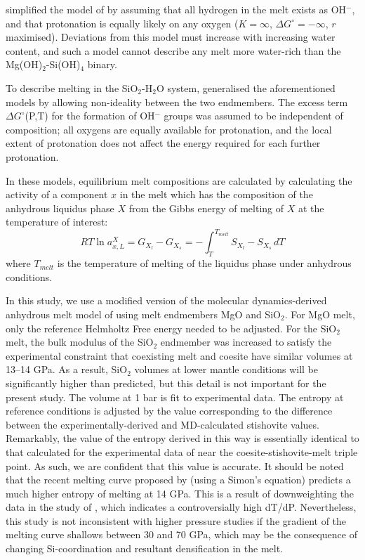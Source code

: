 \documentclass[review]{elsarticle}
\begin{document}
\cite{THH2012} simplified the model of \cite{SS1985} by assuming that all hydrogen in the melt exists as OH$^-$, and that protonation is equally likely on any oxygen ($K=\infty$, $\Delta G^{\circ}=-\infty$, $r$ maximised). Deviations from this model must increase with increasing water content, and such a model cannot describe any melt more water-rich than the Mg(OH)$_2$-Si(OH)$_4$ binary. 

To describe melting in the SiO$_2$-H$_2$O system, \cite{HM2012} generalised the aforementioned models by allowing non-ideality between the two endmembers. The excess term $\Delta G^{\circ}$(P,T) for the formation of OH$^-$ groups was assumed to be independent of composition; all oxygens are equally available for protonation, and the local extent of protonation does not affect the energy required for each further protonation.

In these models, equilibrium melt compositions are calculated by calculating the activity of a component $x$ in the melt which has the composition of the anhydrous liquidus phase $X$ from the Gibbs energy of melting of $X$ at the temperature of interest:
\begin{equation}
RT \ln a_{x,L}^X = G_{X_l} - G_{X_{s}} = - \int_T^{T_{melt}} S_{X_{l}}-S_{X_s} \, dT
\end{equation}
where $T_{melt}$ is the temperature of melting of the liquidus phase under anhydrous conditions. 

In this study, we use a modified version of the molecular dynamics-derived anhydrous melt model of \cite{DKS2013} using melt endmembers MgO and SiO$_2$. For MgO melt, only the reference Helmholtz Free energy needed to be adjusted. For the SiO$_2$ melt, the bulk modulus of the SiO$_2$ endmember was increased to satisfy the experimental constraint that coexisting melt and coesite have similar volumes at 13--14 GPa. As a result, SiO$_2$ volumes at lower mantle conditions will be significantly higher than predicted, but this detail is not important for the present study. The volume at 1 bar is fit to experimental data. The entropy at reference conditions is adjusted by the value corresponding to the difference between the experimentally-derived and MD-calculated stishovite values. Remarkably, the value of the entropy derived in this way is essentially identical to that calculated for the experimental data of \cite{} near the coesite-stishovite-melt triple point. As such, we are confident that this value is accurate. It should be noted that the recent melting curve proposed by \cite{} (using a Simon's equation) predicts a much higher entropy of melting at 14 GPa. This is a result of downweighting the data in the study of \cite{}, which indicates a controversially high dT/dP. Nevertheless, this study is not inconsistent with higher pressure studies \citep{} if the gradient of the melting curve shallows between 30 and 70 GPa, which may be the consequence of changing Si-coordination and resultant densification in the melt. 
\end{document}
